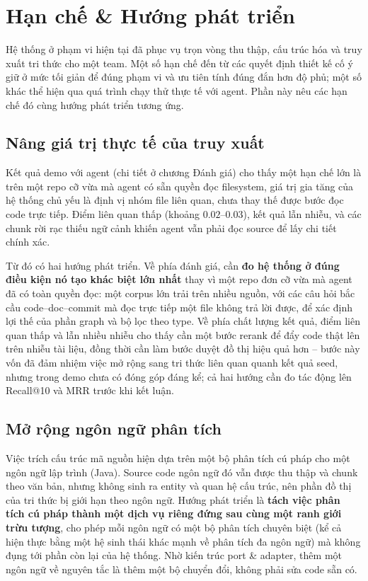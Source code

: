 \section{Hạn chế \& Hướng phát triển}

Hệ thống ở phạm vi hiện tại đã phục vụ trọn vòng thu thập, cấu trúc hóa và truy xuất tri thức cho một team. Một số hạn chế đến từ các quyết định thiết kế cố ý giữ ở mức tối giản để đúng phạm vi và ưu tiên tính đúng đắn hơn độ phủ; một số khác thể hiện qua quá trình chạy thử thực tế với agent. Phần này nêu các hạn chế đó cùng hướng phát triển tương ứng.

\subsection{Nâng giá trị thực tế của truy xuất}

Kết quả demo với agent (chi tiết ở chương Đánh giá) cho thấy một hạn chế lớn là trên một repo cỡ vừa mà agent có sẵn quyền đọc filesystem, giá trị gia tăng của hệ thống chủ yếu là định vị nhóm file liên quan, chưa thay thế được bước đọc code trực tiếp. Điểm liên quan thấp (khoảng $0.02$--$0.03$), kết quả lẫn nhiễu, và các chunk rời rạc thiếu ngữ cảnh khiến agent vẫn phải đọc source để lấy chi tiết chính xác.

Từ đó có hai hướng phát triển. Về phía đánh giá, cần \textbf{đo hệ thống ở đúng điều kiện nó tạo khác biệt lớn nhất} thay vì một repo đơn cỡ vừa mà agent đã có toàn quyền đọc: một corpus lớn trải trên nhiều nguồn, với các câu hỏi bắc cầu code--doc--commit mà đọc trực tiếp một file không trả lời được, để xác định lợi thế của phần graph và bộ lọc theo type. Về phía chất lượng kết quả, điểm liên quan thấp và lẫn nhiều nhiễu cho thấy cần một bước rerank để đẩy code thật lên trên nhiễu tài liệu, đồng thời cần làm bước duyệt đồ thị hiệu quả hơn -- bước này vốn đã đảm nhiệm việc mở rộng sang tri thức liên quan quanh kết quả seed, nhưng trong demo chưa có đóng góp đáng kể; cả hai hướng cần đo tác động lên Recall@10 và MRR trước khi kết luận.

\subsection{Mở rộng ngôn ngữ phân tích}

Việc trích cấu trúc mã nguồn hiện dựa trên một bộ phân tích cú pháp cho một ngôn ngữ lập trình (Java). Source code ngôn ngữ đó vẫn được thu thập và chunk theo văn bản, nhưng không sinh ra entity và quan hệ cấu trúc, nên phần đồ thị của tri thức bị giới hạn theo ngôn ngữ. Hướng phát triển là \textbf{tách việc phân tích cú pháp thành một dịch vụ riêng đứng sau cùng một ranh giới trừu tượng}, cho phép mỗi ngôn ngữ có một bộ phân tích chuyên biệt (kể cả hiện thực bằng một hệ sinh thái khác mạnh về phân tích đa ngôn ngữ) mà không đụng tới phần còn lại của hệ thống. Nhờ kiến trúc port \& adapter, thêm một ngôn ngữ về nguyên tắc là thêm một bộ chuyển đổi, không phải sửa code sẵn có.

